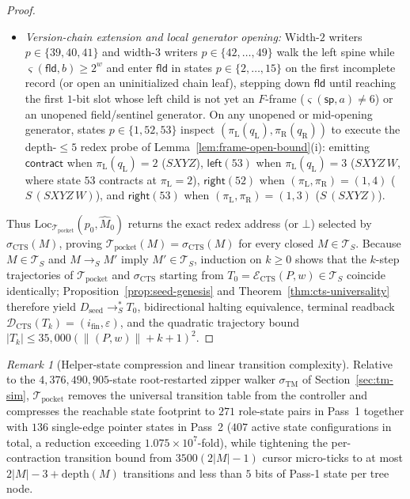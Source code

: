 \documentclass[11pt,reqno]{amsart}
\numberwithin{equation}{section}
\theoremstyle{plain}
\theoremstyle{definition}
\theoremstyle{remark}
\newtheorem{remark}[theorem]{Remark}
\newcommand{\TS}{\mathcal{T}_S}
\newcommand{\redS}{\to_S}
\newcommand{\redSs}{\to_S^*}
\begin{document}
\begin{proof}
\begin{itemize}[leftmargin=2.0em]
  \item \emph{Version-chain extension and local generator opening:} Width-$2$ writers $p \in \{39,40,41\}$ and width-$3$ writers $p \in \{42,\dots,49\}$ walk the left spine while $\varsigma(\mathsf{fld}, b) \ge 2^w$ and enter $\mathsf{fld}$ in states $p \in \{2,\dots,15\}$ on the first incomplete record (or open an uninitialized chain leaf), stepping down $\mathsf{fld}$ until reaching the first $1$-bit slot whose left child is not yet an $F$-frame ($\varsigma(\mathsf{sp}, a) \ne 6$) or an unopened field/sentinel generator. On any unopened or mid-opening generator, states $p \in \{1, 52, 53\}$ inspect $(\pi_{\mathrm{L}}(q_{\mathrm{L}}), \pi_{\mathrm{R}}(q_{\mathrm{R}}))$ to execute the depth-$\le 5$ redex probe of Lemma~\ref{lem:frame-open-bound}(i): emitting $\mathsf{contract}$ when $\pi_{\mathrm{L}}(q_{\mathrm{L}}) = 2$ ($S X Y Z$), $\mathsf{left}(53)$ when $\pi_{\mathrm{L}}(q_{\mathrm{L}}) = 3$ ($S X Y Z\,W$, where state $53$ contracts at $\pi_{\mathrm{L}} = 2$), $\mathsf{right}(52)$ when $(\pi_{\mathrm{L}}, \pi_{\mathrm{R}}) = (1, 4)$ ($S\,(S X Y Z\,W)$), and $\mathsf{right}(53)$ when $(\pi_{\mathrm{L}}, \pi_{\mathrm{R}}) = (1, 3)$ ($S\,(S X Y Z)$).
\end{itemize}
Thus $\mathrm{Loc}_{\mathcal{T}_{\mathrm{pocket}}}(p_0, \widehat{M}_0)$ returns the exact redex address (or $\bot$) selected by $\sigma_{\mathrm{CTS}}(M)$, proving $\mathcal{T}_{\mathrm{pocket}}(M) = \sigma_{\mathrm{CTS}}(M)$ for every closed $M \in \TS$. Because $M \in \TS$ and $M \redS M'$ imply $M' \in \TS$, induction on $k \ge 0$ shows that the $k$-step trajectories of $\mathcal{T}_{\mathrm{pocket}}$ and $\sigma_{\mathrm{CTS}}$ starting from $T_0 = \mathcal{E}_{\mathrm{CTS}}(P, w) \in \TS$ coincide identically; Proposition~\ref{prop:seed-genesis} and Theorem~\ref{thm:cts-universality} therefore yield $D_{\mathrm{seed}} \redSs T_0$, bidirectional halting equivalence, terminal readback $\mathcal{D}_{\mathrm{CTS}}(T_k) = (i_{\mathrm{fin}}, \varepsilon)$, and the quadratic trajectory bound $|T_k| \le 35{,}000(\|(P, w)\| + k + 1)^2$.
\end{proof}

\begin{remark}[Helper-state compression and linear transition complexity]\label{rem:pocket-helper-compression}
Relative to the $4{,}376{,}490{,}905$-state root-restarted zipper walker $\sigma_{\mathrm{TM}}$ of Section~\ref{sec:tm-sim}, $\mathcal{T}_{\mathrm{pocket}}$ removes the universal transition table from the controller and compresses the reachable state footprint to $271$ role-state pairs in Pass~1 together with $136$ single-edge pointer states in Pass~2 ($407$ active state configurations in total, a reduction exceeding $1.075 \times 10^7$-fold), while tightening the per-contraction transition bound from $3500(2|M| - 1)$ cursor micro-ticks to at most $2|M| - 3 + \mathrm{depth}(M)$ transitions and less than $5$ bits of Pass-1 state per tree node.
\end{remark}
\end{document}
